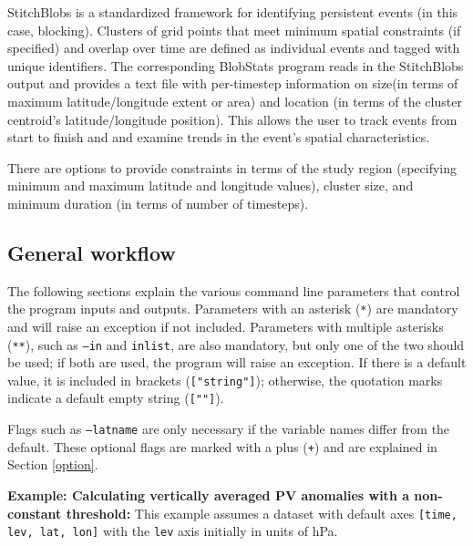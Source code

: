 \documentclass{article}
\begin{document}
StitchBlobs is a standardized framework for identifying persistent events (in this case, blocking). Clusters of grid points that meet minimum spatial constraints (if specified) and overlap over time are defined as individual events and tagged with unique identifiers. The corresponding BlobStats program reads in the StitchBlobs output and provides a text file with per-timestep information on size(in terms of maximum latitude/longitude extent or area) and location (in terms of the cluster centroid's latitude/longitude position). This allows the user to track events from start to finish and and examine trends in the event's spatial characteristics.

There are options to provide constraints in terms of the study region (specifying minimum and maximum latitude and longitude values), cluster size, and minimum duration (in terms of number of timesteps).

\subsection{General workflow}

The following sections explain the various command line parameters that control the program inputs and outputs. Parameters with an asterisk (\texttt{*}) are mandatory and will raise an exception if not included. Parameters with multiple asterisks (\texttt{**}), such as \texttt{--in} and \texttt{inlist}, are also mandatory, but only one of the two should be used; if both are used, the program will raise an exception. If there is a default value, it is included in brackets (\texttt{["string"]}); otherwise, the quotation marks indicate a default empty string (\texttt{[""]}).

Flags such as \texttt{--latname} are only necessary if the variable names differ from the default. These optional flags are marked with a plus (\texttt{+}) and are explained in Section \ref{option}.

\textbf{Example: Calculating vertically averaged PV anomalies with a non-constant threshold:} This example assumes a dataset with default axes \texttt{[time, lev, lat, lon]} with the \texttt{lev} axis initially in units of hPa.
\end{document}
